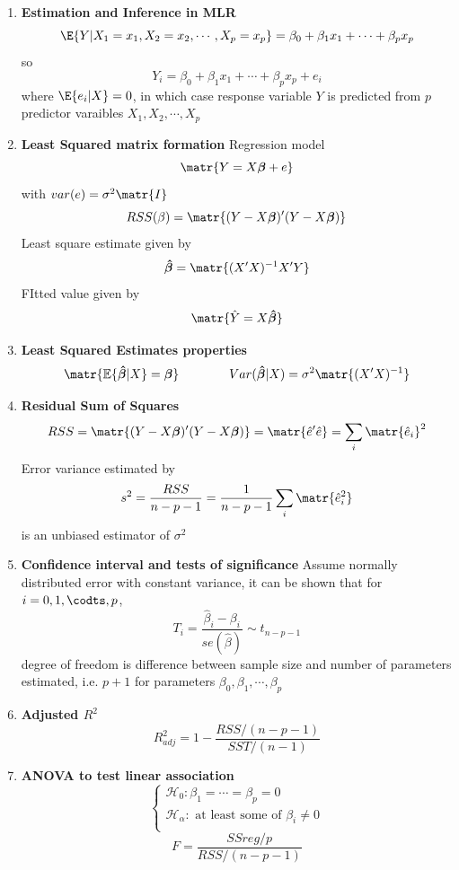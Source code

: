 \documentclass[11pt]{article}
\newcommand{\bbeta}{\boldsymbol{\beta}}
\newcommand{\bbetahat}{\boldsymbol{\hat{\beta}}}
\newcommand{\e}[1]{\mathbb{E} \{#1\}}
\begin{document}
\begin{enumerate}
    \item \textbf{Estimation and Inference in MLR} 
    \[
        \E\{ Y|X_1=x_1, X_2=x_2,\cdots,X_p=x_p \} = \beta_0 + \beta_1 x_1 + \cdots + \beta_p x_p 
    \]
    so 
    \[
        Y_i = \beta_0 + \beta_1 x_1 + \cdots + \beta_p x_p + e_i
    \]
    where $\E\{e_i | X\} = 0$, in which case response variable $Y$ is predicted from $p$ predictor varaibles $X_1,X_2,\cdots, X_p$
    \item \textbf{Least Squared matrix formation} 
    Regression model
    \[
        \matr{ Y = X\bbeta + e}    
    \]
    with $var(e) =\sigma^2\matr{I}$
    \[
        RSS(\beta) = \matr{(Y - X\bbeta)'(Y - X\bbeta)}
    \]
    Least square estimate given by
    \[
        \bbetahat = \matr{(X'X)^{-1}X'Y}    
    \]
    FItted value given by
    \[
        \matr{ \hat{Y} = X\bbetahat }
    \]
    \item \textbf{Least Squared Estimates properties}
    \[
        \matr{ \e{\bbetahat | X} = \bbeta } \quad \quad \quad \quad 
        Var(\bbetahat | X) = \sigma^2 \matr{(X'X)^{-1}}
    \]
    \item \textbf{Residual Sum of Squares}
    \[
        RSS =  \matr{(Y - X\bbeta)'(Y - X\bbeta)} = \matr{\hat{e}' \hat{e}} = \sum_i \matr{\hat{e}_i}^2 
    \]
    Error variance estimated by 
    \[
        s^2 = \frac{RSS}{n-p-1} = \frac{1}{n-p-1} \sum_i \matr{\hat{e}_i^2}    
    \]
    is an unbiased estimator of $\sigma^2$
    \item \textbf{Confidence interval and tests of significance} Assume normally distributed error with constant variance, it can be shown that for $i = 0, 1, \codts, p$, 
    \[
        T_i = \frac{ \hat{\beta}_i - \beta_i }{ se(\hat{\beta}) }  \sim t_{n-p-1}
    \]
    degree of freedom is difference between sample size and number of parameters estimated, i.e. $p+1$ for parameters $\beta_0, \beta_1, \cdots, \beta_p$
    \item \textbf{Adjusted $R^2$}
    \[
        R^2_{adj} = 1 - \frac{RSS / (n-p-1)}{SST / (n-1)}    
    \]
    \item \textbf{ANOVA to test linear association} 
    \[
        \begin{cases}
            \mathcal{H}_0 : \beta_1 = \cdots = \beta_p = 0 \\
            \mathcal{H}_{\alpha} : \text{ at least some of } \beta_i \neq 0 \\ 
        \end{cases}    
    \]
    \[
        F = \frac{SSreg / p}{ RSS / (n-p-1)}    
\]
\end{enumerate}
\end{document}
